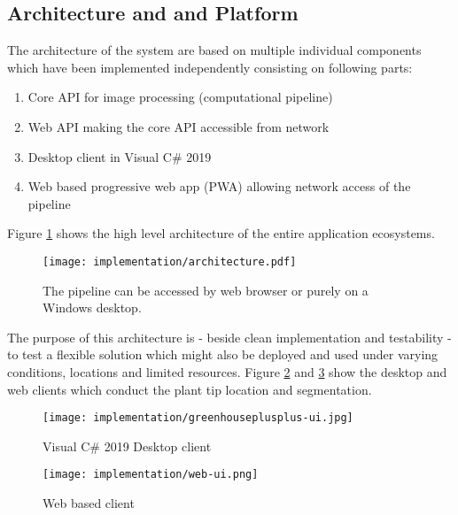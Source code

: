 \subsection{Architecture and and Platform}\label{sec:architecture}

The architecture of the system are based on multiple individual components which have been implemented
independently consisting on following parts:

\begin{enumerate}
    \item Core API for image processing (computational pipeline) \cite{greenhouseplusplus}
    \item Web API making the core API accessible from network \cite{greenhouseplusplus}
    \item Desktop client in Visual C\# 2019 \cite{greenhouseplusplus}
    \item Web based progressive web app (PWA) allowing network access of the pipeline \cite{greenhouseplusplus:app}
\end{enumerate}

Figure \ref{fig:arch} shows the high level architecture of the entire application ecosystems.

\begin{figure}[H]
    \centering
    \texttt{[image: implementation/architecture.pdf]}
    \caption{The pipeline can be accessed by web browser or purely on a Windows desktop.}
    \label{fig:arch}
\end{figure}

The purpose of this architecture is - beside clean implementation and testability - to test a flexible
solution which might also be deployed and used under varying conditions, locations and limited resources.
Figure \ref{fig:desktopclient} and \ref{fig:webclient} show the desktop and web clients
which conduct the plant tip location and segmentation.

\begin{figure}[H]
    \centering
    \texttt{[image: implementation/greenhouseplusplus-ui.jpg]}
    \caption{Visual C\# 2019 Desktop client}
    \label{fig:desktopclient}
\end{figure}

\begin{figure}[H]
    \centering
    \texttt{[image: implementation/web-ui.png]}
    \caption{Web based client}
    \label{fig:webclient}
\end{figure}
